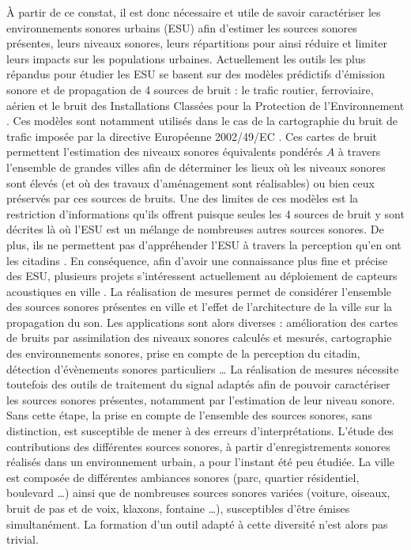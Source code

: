 À partir de ce constat, il est donc nécessaire et utile de savoir caractériser les environnements sonores urbains (ESU) afin d'estimer les sources sonores présentes, leurs niveaux sonores, leurs répartitions pour ainsi réduire et limiter leurs impacts sur les populations urbaines.
Actuellement les outils les plus répandus pour étudier les ESU se basent sur des modèles prédictifs d'émission sonore et de propagation de 4 sources de bruit : le trafic routier, ferroviaire, aérien et le bruit des Installations Classées pour la Protection de l'Environnement . Ces modèles sont notamment utilisés dans le cas de la cartographie du bruit de trafic imposée par la directive Européenne 2002/49/EC \cite{directive}. Ces cartes de bruit permettent l'estimation des niveaux sonores équivalents pondérés $A$ à travers l'ensemble de grandes villes afin de déterminer les lieux où les niveaux sonores sont élevés (et où des travaux d'aménagement sont réalisables) ou bien ceux préservés par ces sources de bruits. Une des limites  de ces modèles est la restriction d'informations qu'ils offrent puisque seules les 4 sources de bruit y sont décrites là où l'ESU est un mélange de nombreuses autres sources sonores. De plus, ils ne permettent pas d'appréhender l'ESU à travers la perception qu'en ont les citadins \cite{aumond2017modeling}.
En conséquence, afin d'avoir une connaissance plus fine et précise des ESU, plusieurs projets s'intéressent actuellement au déploiement de capteurs acoustiques en ville \cite{picaut2017characterization,zambon2017life}. La réalisation de mesures permet de considérer l'ensemble des sources sonores présentes en ville et l'effet de l'architecture de la ville sur la propagation du son. Les applications sont alors diverses : amélioration des cartes de bruits par assimilation des niveaux sonores calculés et mesurés, cartographie des environnements sonores, prise en compte de la perception du citadin, détection d'évènements sonores particuliers \dots{}
La réalisation de mesures nécessite toutefois des outils de traitement du signal adaptés afin de pouvoir caractériser les sources sonores présentes, notamment par l'estimation de leur niveau sonore. Sans cette étape, la prise en compte de l'ensemble des sources sonores, sans distinction, est susceptible de mener à des erreurs d'interprétations. L'étude des contributions des différentes sources sonores, à partir d'enregistrements sonores réalisés dans un environnement urbain, a pour l'instant été peu étudiée.
La ville est composée de différentes ambiances sonores (parc, quartier résidentiel, boulevard \dots{}) ainsi que de nombreuses sources sonores variées (voiture, oiseaux, bruit de pas et de voix, klaxons, fontaine \dots{}), susceptibles d'être émises simultanément. La formation d'un outil adapté à cette diversité n'est alors pas trivial.

